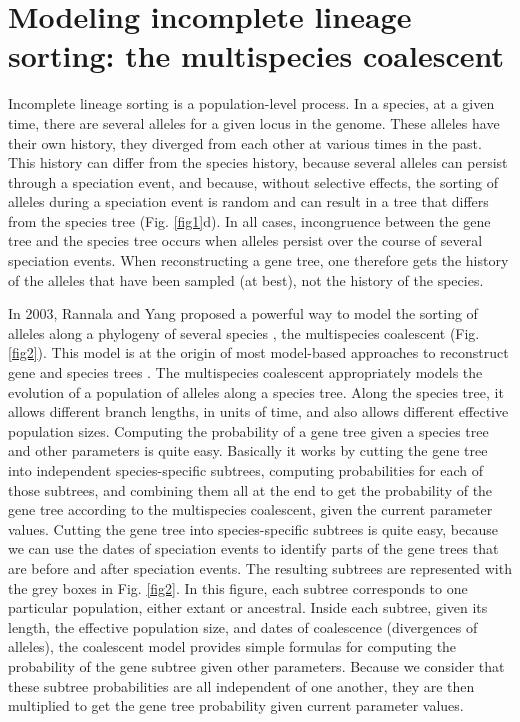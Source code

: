 \section{Modeling incomplete lineage sorting: the multispecies coalescent}
Incomplete lineage sorting is a population-level process.
In a species, at a given time, there are several alleles for a given locus in the genome.
These alleles have their own history, they diverged from each other at various times in the past.
This history can differ from the species history, because several alleles can persist through a speciation event, and because, without selective effects, the sorting of alleles during a speciation event is random and can result in a tree that differs from the species tree (Fig. \ref{fig1}d).
In all cases, incongruence between the gene tree and the species tree occurs when alleles persist over the course of several speciation events.
When reconstructing a gene tree, one therefore gets the history of the alleles that have been sampled (at best), not the history of the species. 

In 2003, Rannala and Yang proposed a powerful way to model the sorting of alleles along a phylogeny of several species \citep{Rannala2003a}, the multispecies coalescent (Fig. \ref{fig2}).
This model is at the origin of most model-based approaches to reconstruct gene and species trees \citep{Edwards2007,Heled2010}.
The multispecies coalescent appropriately models the evolution of a population of alleles along a species tree.
Along the species tree, it allows different branch lengths, in units of time, and also allows different effective population sizes.
Computing the probability of a gene tree given a species tree and other parameters is quite easy.
Basically it works by cutting the gene tree into independent species-specific subtrees, computing probabilities for each of those subtrees, and combining them all at the end to get the probability of the gene tree according to the multispecies coalescent, given the current parameter values.
Cutting the gene tree into species-specific subtrees is quite easy, because we can use the dates of speciation events to identify parts of the gene trees that are before and after speciation events. 
The resulting subtrees are represented with the grey boxes in Fig. \ref{fig2}.
In this figure, each subtree corresponds to one particular population, either extant or ancestral.
Inside each subtree, given its length, the effective population size, and dates of coalescence (divergences of alleles), the coalescent model provides simple formulas for computing the probability of the gene subtree given other parameters.
Because we consider that these subtree probabilities are all independent of one another, they are then multiplied to get the gene tree probability given current parameter values.
 
